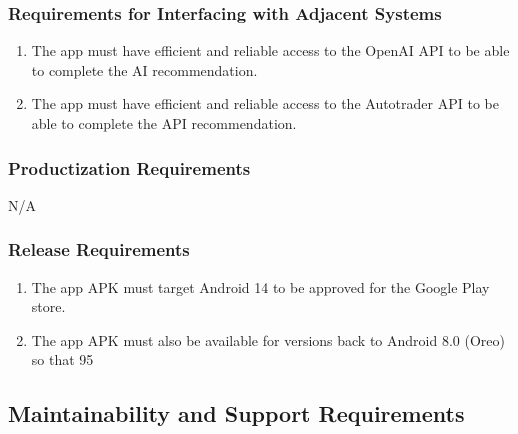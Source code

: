 \documentclass[]{article}
\begin{document}
\subsubsection{Requirements for Interfacing with Adjacent Systems}
\label{ssub:interfacing_adjacent_systems}
\begin{enumerate}[{IF-}1.]
    \item The app must have efficient and reliable access to the OpenAI API to be able to complete the AI recommendation. 
    \item The app must have efficient and reliable access to the Autotrader API to be able to complete the API recommendation.
\end{enumerate}

\subsubsection{Productization Requirements}
\label{ssub:productization_requirements}
N/A

\subsubsection{Release Requirements}
\label{ssub:release_requirements}
\begin{enumerate}[{RL-}1.]
    \item The app APK must target Android 14 to be approved for the Google Play store.
    \item The app APK must also be available for versions back to Android 8.0 (Oreo) so that 95%
\end{enumerate}

\subsection{Maintainability and Support Requirements}
\label{sub:maintainability_and_support_requirements}
\end{document}
